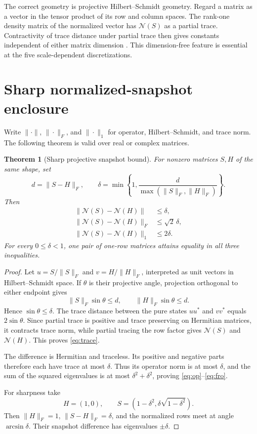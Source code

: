 \documentclass[12pt]{article}
\newtheorem{theorem}{Theorem}
\begin{document}
The correct geometry is projective Hilbert--Schmidt geometry.  Regard a
matrix as a vector in the tensor product of its row and column spaces.  The
rank-one density matrix of the normalized vector has $\mathcal N(S)$ as a
partial trace.  Contractivity of trace distance under partial trace then
gives constants independent of either matrix dimension
\citep{NielsenChuang2010}.  This dimension-free feature is essential at the
five scale-dependent discretizations.

\section{Sharp normalized-snapshot enclosure}
Write $\|\cdot\|$, $\|\cdot\|_F$, and $\|\cdot\|_1$ for operator,
Hilbert--Schmidt, and trace norm.  The following theorem is valid over real or
complex matrices.

\begin{theorem}[Sharp projective snapshot bound]\label{thm:main}
For nonzero matrices $S,H$ of the same shape, set
\[
 d=\|S-H\|_F,
 \qquad
 \delta=\min\left\{1,\frac d{\max(\|S\|_F,\|H\|_F)}\right\}.
\]
Then
\begin{align}
 \|\mathcal N(S)-\mathcal N(H)\|&\leq\delta,\label{eq:op}\\
 \|\mathcal N(S)-\mathcal N(H)\|_F&\leq\sqrt2\,\delta,\label{eq:fro}\\
 \|\mathcal N(S)-\mathcal N(H)\|_1&\leq2\delta.\label{eq:trace}
\end{align}
For every $0\leq\delta<1$, one pair of one-row matrices attains equality in
all three inequalities.
\end{theorem}

\begin{proof}
Let $u=S/\|S\|_F$ and $v=H/\|H\|_F$, interpreted as unit vectors in
Hilbert--Schmidt space.  If $\theta$ is their projective angle, projection
orthogonal to either endpoint gives
\[
 \|S\|_F\sin\theta\leq d,
 \qquad
 \|H\|_F\sin\theta\leq d.
\]
Hence $\sin\theta\leq\delta$.  The trace distance between the pure states
$uu^*$ and $vv^*$ equals $2\sin\theta$.  Since partial trace is positive and
trace preserving on Hermitian matrices, it contracts trace norm, while
partial tracing the row factor gives $\mathcal N(S)$ and $\mathcal N(H)$.
This proves \eqref{eq:trace}.

The difference is Hermitian and traceless.  Its positive and negative parts
therefore each have trace at most $\delta$.  Thus its operator norm is at
most $\delta$, and the sum of the squared eigenvalues is at most
$\delta^2+\delta^2$, proving \eqref{eq:op}--\eqref{eq:fro}.

For sharpness take
\[
 H=(1,0),\qquad
 S=(1-\delta^2,\delta\sqrt{1-\delta^2}).
\]
Then $\|H\|_F=1$, $\|S-H\|_F=\delta$, and the normalized rows meet at angle
$\arcsin\delta$.  Their snapshot difference has eigenvalues $\pm\delta$.
\end{proof}
\end{document}
